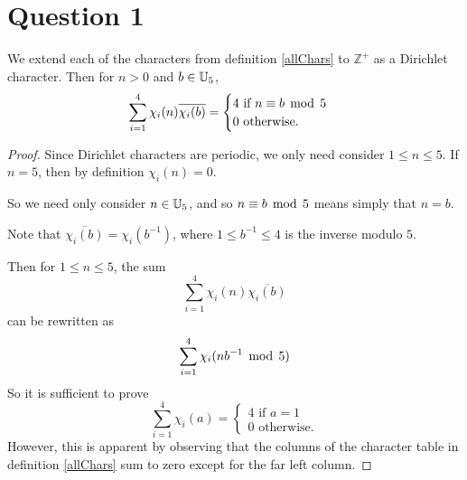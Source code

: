 \documentclass{unswmaths}
\begin{document}
\section*{Question 1}
\begin{lemma}
    We extend each of the characters from definition \ref{allChars} to $\mathbb{Z}^+$ as
    a Dirichlet character. Then for $n > 0$ and $b \in \mathbb{U}_5$, 
    \begin{equation*}
        \sum_{i=1}^4 \chi_i(n)\overline{\chi_i(b)} = \begin{cases}
            4\text{ if }n\equiv b\;\operatorname{mod}\;5\\
            0\text{ otherwise.}
        \end{cases}
    \end{equation*}
\end{lemma}
\begin{proof}
    Since Dirichlet characters are periodic, we only need consider $1 \leq n \leq 5$. If $n = 5$, then 
    by definition $\chi_i(n) = 0$.
    
    So we need only consider $n \in \mathbb{U}_5$, and so $n\equiv b\;\operatorname{mod}\;5$ means simply that $n = b$. 
    
    Note that $\overline{\chi_i(b)} = \chi_i(b^{-1})$, where $1 \leq b^{-1} \leq 4$ is the inverse modulo $5$.
    
    Then for $1 \leq n \leq 5$, the sum
    \begin{equation*}
        \sum_{i=1}^4 \chi_i(n)\overline{\chi_i(b)}
    \end{equation*}
    can be rewritten as
    \begin{equation*}
        \sum_{i=1}^4 \chi_i(nb^{-1} \;\operatorname{mod}\;5)
    \end{equation*}
    So it is sufficient to prove
    \begin{equation*}
        \sum_{i=1}^4 \chi_i(a) = \begin{cases}
            4\text{ if }a = 1\\
            0\text{ otherwise.}
        \end{cases}
    \end{equation*}
    However, this is apparent by observing that the columns of the character table in definition \ref{allChars} sum to zero
    except for the far left column.
\end{proof}
\end{document}
